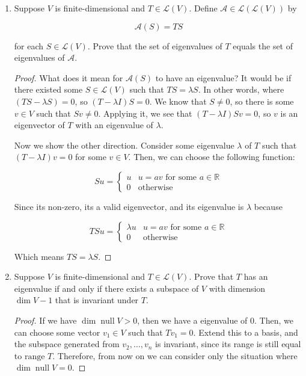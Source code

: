 \begin{enumerate}
\begin{proof}
    \end{proof}

\item[37] Suppose $V$ is finite-dimensional and $T \in \mathcal L(V)$. Define $\mathcal A \in \mathcal L(\mathcal L(V))$ by

$$\mathcal A(S) = TS$$

for each $S \in \mathcal L(V)$. Prove that the set of eigenvalues of $T$ equals the set of eigenvalues of $\mathcal A$. 

\begin{proof}

What does it mean for $\mathcal A(S)$ to have an eigenvalue? It would be if there existed some $S \in \mathcal L(V)$ such that $TS = \lambda S$. In other words, where $(TS - \lambda S) = 0$, so $(T - \lambda I)S = 0$. We know that $S \neq 0$, so there is some $v \in V$ such that $Sv \ne 0$. Applying it, we see that $(T - \lambda I)Sv = 0$, so $v$ is an eigenvector of $T$ with an eigenvalue of $\lambda$.

Now we show the other direction. Consider some eigenvalue $\lambda$ of $T$ such that $(T - \lambda I)v = 0$ for some $v \in V$. Then, we can choose the following function:

$$
Su = \begin{cases}
u & u = av \text{ for some } a \in \mathbb R \\
0 & \text{otherwise}
\end{cases}
$$

Since its non-zero, its a valid eigenvector, and its eigenvalue is $\lambda$ because

$$TSu = \begin{cases}
\lambda u & u = av \text{ for some } a \in \mathbb R \\
0 & \text{otherwise}
\end{cases}
$$

Which means $TS = \lambda S$.
\end{proof} 

\item[39] Suppose $V$ is finite-dimensional and $T \in \mathcal L(V)$. Prove that $T$ has an eigenvalue if and only if there exists a subspace of $V$ with dimension $\dim V - 1$ that is invariant under $T$.


\begin{proof}
If we have $\dim \operatorname{null} V > 0$, then we have a eigenvalue of 0. Then, we can choose some vector $v_1 \in V$ such that $Tv_1 = 0$. Extend this to a basis, and the subspace generated from $v_2, \dots, v_n$ is invariant, since its range is still equal to $\text{range } T$. Therefore, from now on we can consider only the situation where $\dim \operatorname{null} V = 0$.


\end{proof}
\end{enumerate}
